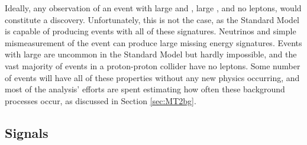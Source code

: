   Ideally, any observation of an event with large \met and \mttwo, large \Ht, and no leptons, would constitute a discovery.
  Unfortunately, this is not the case, as the Standard Model is capable of producing events with all of these signatures.
  Neutrinos and simple mismeasurement of the event can produce large missing energy signatures.
  Events with large \Ht are uncommon in the Standard Model but hardly impossible, and the vast majority of events in a proton-proton collider have no leptons.
  Some number of events will have all of these properties without any new physics occurring, and most of the analysis' efforts are spent estimating how often these background processes occur, as discussed in Section \ref{sec:MT2bg}.

  \subsection{Signals} \label{sec:MT2sig}

